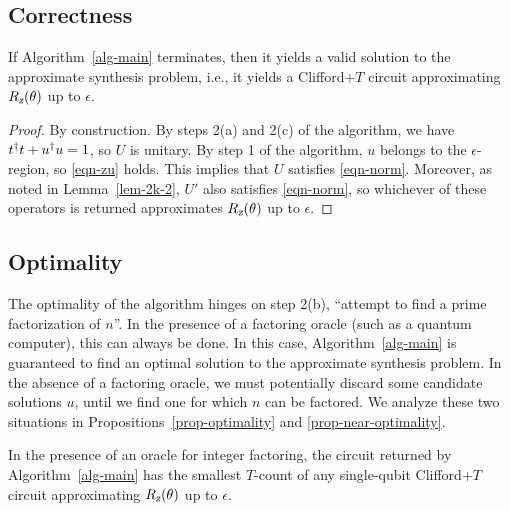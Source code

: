 \documentclass{article}
\begin{document}
\subsection{Correctness}

\begin{proposition}[Correctness]
  If Algorithm~\ref{alg-main} terminates, then it yields a valid
  solution to the approximate synthesis problem, i.e., it yields a
  Clifford+$T$ circuit approximating $R_{\textsl{z}}(\theta)$ up to $\epsilon$.
\end{proposition}

\begin{proof}
  By construction. By steps 2(a) and 2(c) of the algorithm, we have
  ${t}^{\dagger} t+{u}^{\dagger} u=1$, so $U$ is unitary. By step 1 of the
  algorithm, $u$ belongs to the $\epsilon$-region, so
  {\eqref{eqn-zu}} holds. This implies that $U$ satisfies
  {\eqref{eqn-norm}}. Moreover, as noted in Lemma~\ref{lem-2k-2}, $U'$
  also satisfies {\eqref{eqn-norm}}, so whichever of these operators
  is returned approximates $R_{\textsl{z}}(\theta)$ up to $\epsilon$.
\end{proof}

\subsection{Optimality}

The optimality of the algorithm hinges on step 2(b), ``attempt to find
a prime factorization of $n$''. In the presence of a factoring oracle
(such as a quantum computer), this can always be done. In this case,
Algorithm~\ref{alg-main} is guaranteed to find an optimal solution to
the approximate synthesis problem. In the absence of a factoring
oracle, we must potentially discard some candidate solutions $u$,
until we find one for which $n$ can be factored. We analyze these two
situations in Propositions~\ref{prop-optimality} and
{\ref{prop-near-optimality}}.

\begin{proposition}
  \label{prop-optimality}
  In the presence of an oracle for integer factoring, the circuit
  returned by Algorithm~\ref{alg-main} has the smallest $T$-count of
  any single-qubit Clifford+$T$ circuit approximating $R_{\textsl{z}}(\theta)$ up
  to $\epsilon$.
\end{proposition}
\end{document}
